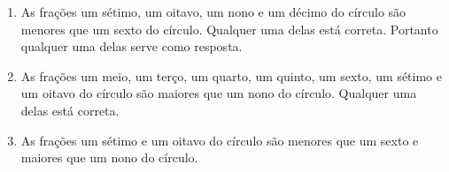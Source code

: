 \begin{atividade}
\begin{enumerate}
    \item       As frações um sétimo, um oitavo, um nono e um décimo do círculo são menores que um sexto do círculo. Qualquer uma delas está correta. Portanto qualquer uma delas serve como resposta.
    \item       As frações um meio, um terço, um quarto, um quinto, um sexto, um sétimo e um oitavo do círculo são maiores que um nono do círculo. Qualquer uma delas está correta.
    \item       As frações um sétimo e um oitavo do círculo são menores que um sexto e maiores que um nono do círculo.
\end{enumerate} %

\end{atividade}

\clearpage

